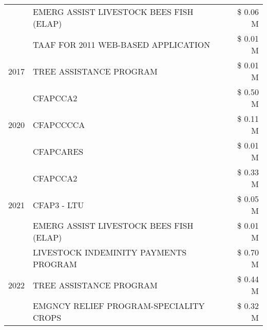 \begin{tabular}{llr}
 & EMERG ASSIST LIVESTOCK BEES FISH (ELAP) & \$ 0.06 M \\
 & TAAF FOR 2011 WEB-BASED APPLICATION & \$ 0.01 M \\
\cline{1-3}
2017 & TREE ASSISTANCE PROGRAM & \$ 0.01 M \\
\cline{1-3}
\multirow[t]{3}{*}{2020} & CFAPCCA2 & \$ 0.50 M \\
 & CFAPCCCCA & \$ 0.11 M \\
 & CFAPCARES & \$ 0.01 M \\
\cline{1-3}
\multirow[t]{3}{*}{2021} & CFAPCCA2 & \$ 0.33 M \\
 & CFAP3 - LTU & \$ 0.05 M \\
 & EMERG ASSIST LIVESTOCK BEES FISH (ELAP) & \$ 0.01 M \\
\cline{1-3}
\multirow[t]{3}{*}{2022} & LIVESTOCK INDEMINITY PAYMENTS PROGRAM & \$ 0.70 M \\
 & TREE ASSISTANCE PROGRAM & \$ 0.44 M \\
 & EMGNCY RELIEF PROGRAM-SPECIALITY CROPS & \$ 0.32 M \\
\cline{1-3}
\bottomrule
\end{tabular}
